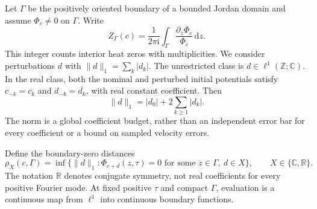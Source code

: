 \documentclass[11pt]{article}
\newcommand{\C}{\mathbb C}\newcommand{\R}{\mathbb R}\newcommand{\Z}{\mathbb Z}\newcommand{\e}{\mathrm e}\newcommand{\ii}{\mathrm i}\newcommand{\dd}{\,\mathrm d}
\begin{document}
Let $\Gamma$ be the positively oriented boundary of a bounded Jordan domain and assume $\Phi_c\ne0$ on $\Gamma$. Write
\begin{equation}
 Z_\Gamma(c)=\frac{1}{2\pi\ii}\int_\Gamma\frac{\partial_z\Phi_c}{\Phi_c}\dd z.
\end{equation}
This integer counts interior heat zeros with multiplicities. We consider perturbations $d$ with $\|d\|_1=\sum_k|d_k|$. The unrestricted class is $d\in\ell^1(\Z;\C)$. In the real class, both the nominal and perturbed initial potentials satisfy $c_{-k}=\overline{c_k}$ and $d_{-k}=\overline{d_k}$, with real constant coefficient. Then
\begin{equation}\label{eq:realnorm}
 \|d\|_1=|d_0|+2\sum_{k\ge1}|d_k|.
\end{equation}
The norm is a global coefficient budget, rather than an independent error bar for every coefficient or a bound on sampled velocity errors.

Define the boundary-zero distances
\begin{equation}\label{eq:distance}
 \rho_X(c,\Gamma)=\inf\{\|d\|_1:\Phi_{c+d}(z,\tau)=0
 \text{ for some }z\in\Gamma,\ d\in X\},\qquad X\in\{\C,\R\}.
\end{equation}
The notation $\R$ denotes conjugate symmetry, not real coefficients for every positive Fourier mode. At fixed positive $\tau$ and compact $\Gamma$, evaluation is a continuous map from $\ell^1$ into continuous boundary functions.
\end{document}
